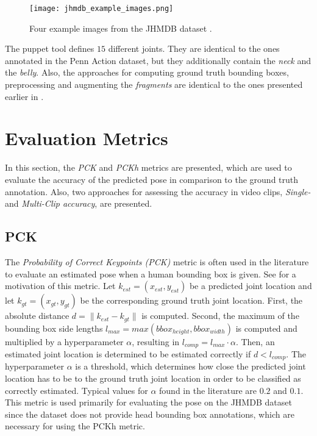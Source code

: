\begin{figure}[htb!]
    \centering
    \texttt{[image: jhmdb\_example\_images.png]}
    \caption{Four example images from the JHMDB dataset \cite{jhuang_towards_2013}. }
    \label{fig:jhmdb_example_images}
\end{figure}

The puppet tool defines $15$ different joints.
They are identical to the ones annotated in the Penn Action dataset, but they additionally contain the \textit{neck} and the \textit{belly}.
Also, the approaches for computing ground truth bounding boxes, preprocessing and augmenting the \textit{fragments} are identical to the ones presented earlier in .

\section{Evaluation Metrics}
\label{sec:exp-metrics}
In this section, the \textit{PCK} and \textit{PCKh} metrics are presented, which are used to evaluate the accuracy of the predicted pose in comparison to the ground truth annotation.
Also, two approaches for assessing the accuracy in video clips, \textit{Single-} and \textit{Multi-Clip accuracy}, are presented.

\subsection{PCK}
\label{sec:exp-pck}

The \textit{Probability of Correct Keypoints (PCK)} metric \cite{ferrari_progressive_2008} is often used in the literature to evaluate an estimated pose when a human bounding box is given.
See  for a motivation of this metric.
Let $k_{est} = (x_{est}, y_{est})$ be a predicted joint location and let $k_{gt} = (x_{gt}, y_{gt})$ be the corresponding ground truth joint location.
First, the absolute distance $d = \lVert k_{est} - k_{gt} \rVert$ is computed.
Second, the maximum of the bounding box side lengths $l_{max} = max(bbox_{height}, bbox_{width})$ is computed and multiplied by a hyperparameter $\alpha$, resulting in $l_{comp} = l_{max} \cdot \alpha$.
Then, an estimated joint location is determined to be estimated correctly if $d < l_{comp}$.
The hyperparameter $\alpha$ is a threshold, which determines how close the predicted joint location has to be to the ground truth joint location in order to be classified as correctly estimated.
Typical values for $\alpha$ found in the literature are $0.2$ and $0.1$.
This metric is used primarily for evaluating the pose on the JHMDB dataset since the dataset does not provide head bounding box annotations, which are necessary for using the PCKh metric.

